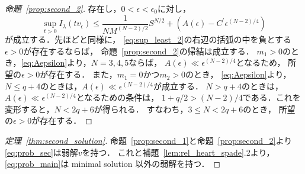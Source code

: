 \begin{proof}[命題~\ref{prop:second_2}]
 存在し，$0 < \epsilon < \epsilon_0$に対し，
 \begin{equation}
  \sup_{t > 0} I_\lambda (tv_\epsilon) \leq \frac{1}{NM^{(N-2)/2}}
   S^{N/2} + \left( A(\epsilon) - C^\prime \epsilon^{(N-2)/4}
             \right) \label{eq:sup_least_2}
 \end{equation}
 が成立する．先ほどと同様に，
 \eqref{eq:sup_least_2}の右辺の括弧の中を負とする
 $\epsilon > 0$が存在するならば，
 命題~\ref{prop:second_2}の帰結は成立する．
 $m_1 > 0$のとき，\eqref{eq:Aepsilon}より，$N = 3, 4, 5$ならば，
 $A(\epsilon) \ll \epsilon^{(N-2)/4}$となるため，
 所望の$\epsilon > 0$が存在する．
 また，$m_1 = 0$かつ$m_2 > 0$のとき，
 \eqref{eq:Aepsilon}より，
 $N \leq q+4$のときは，$A(\epsilon) \ll \epsilon^{(N-2)/4}$が成立する．
 $N > q+4$のときは，
 $A(\epsilon) \ll \epsilon^{(N-2)/4}$となるための条件は，
 $1+q/2 > (N-2)/4$である．これを変形すると，$N < 2q+6$が得られる．
 すなわち，$3 \leq N < 2q+6$のとき，
 所望の$\epsilon > 0$が存在する．\qedhere
\end{proof}

\begin{proof}[定理~\ref{thm:second_solution}]
 命題~\ref{prop:second_1}と命題~\ref{prop:second_2}より
 \ref{eq:prob_sec}は弱解$v$を持つ．
 これと補題~\ref{lem:rel_heart_spade}.2より，\ref{eq:prob_main}は
 minimal solution 以外の弱解を持つ．
 \qedhere
\end{proof}

